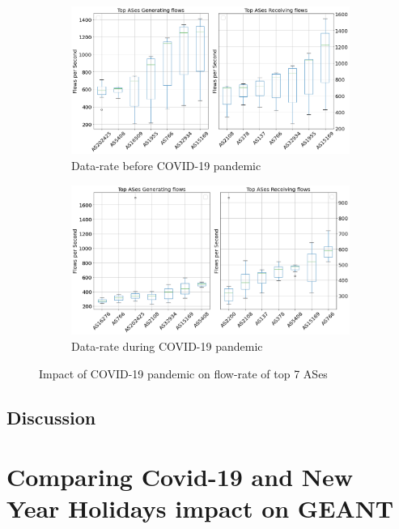 \documentclass[10pt, journal, letterpaper]{IEEEtran}
\begin{document}
\begin{figure}[hbt!]
    \centering
    \begin{subfigure}{\columnwidth}
          \centering
          \includegraphics[width=\columnwidth]{img/OWBCO_top7ASes_fps.png}
          \caption{Data-rate before COVID-19 pandemic}
          \label{fig:OWBCO_topAS_fps}
    \end{subfigure}
    \begin{subfigure}{\columnwidth}
          \centering
          \includegraphics[width=\columnwidth]{img/CO2_top7ASes_fps.png}
          \caption{Data-rate during COVID-19 pandemic}
          \label{fig:CO_topAS_fps}
    \end{subfigure}
    \caption{Impact of COVID-19 pandemic on flow-rate of top 7 ASes}
    \label{fig:topAS_fps_OW_CO}
\end{figure}

\subsection{Discussion}

\section{Comparing Covid-19 and New Year Holidays impact on GEANT}
\end{document}
